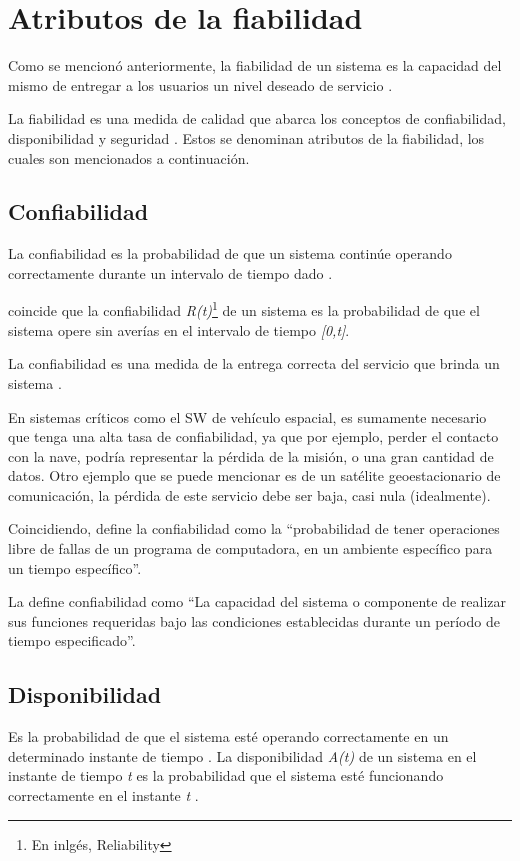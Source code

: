 \section{Atributos de la fiabilidad}\label{sec:atributos_de_la_fiabilidad}
Como se mencionó anteriormente, la fiabilidad de un sistema es la capacidad del mismo de entregar a los usuarios un nivel
deseado de servicio \citep{FTDesign}.

La fiabilidad es una medida de calidad  que abarca los conceptos de confiabilidad, disponibilidad y seguridad \citep{SoftwareFaultToleranceATutorial}. Estos se denominan atributos de la fiabilidad, los cuales son mencionados a continuación.

\subsection{Confiabilidad}\label{subsec:confiabilidad}
La confiabilidad es la probabilidad de que un sistema continúe operando correctamente durante un
intervalo de tiempo dado \citep{SoftwareFaultToleranceATutorial}.

\cite{FTDesign} coincide que la confiabilidad \textit{R(t)}\footnote{En inlgés, Reliability} de un
sistema es la probabilidad de que el sistema opere sin averías en el intervalo de tiempo
\textit{[0,t]}.

La confiabilidad es una medida de la entrega correcta del servicio que brinda un sistema
\citep{FTDesign}.

En sistemas críticos como el \ac{SW} de vehículo espacial, es sumamente necesario que tenga una
alta tasa de confiabilidad, ya que por ejemplo, perder el contacto con la nave, podría representar
la pérdida de la misión, o una gran cantidad de datos. Otro ejemplo que se puede mencionar es de un
satélite geoestacionario de comunicación, la pérdida de este servicio debe ser baja, casi nula
(idealmente).

Coincidiendo, \cite{pressman01} define la confiabilidad como la ``probabilidad de tener operaciones
libre de fallas de un programa de computadora, en un ambiente específico para un tiempo específico''. 

La \cite{IEEE610.12} define confiabilidad como ``La capacidad del sistema o componente de realizar
sus funciones requeridas bajo las condiciones establecidas durante un período de tiempo
especificado''.

\subsection{Disponibilidad}\label{subsec:disponibilidad}
Es la probabilidad de que el sistema esté operando correctamente en un determinado instante de
tiempo \citep{SoftwareFaultToleranceATutorial}. La disponibilidad \textit{A(t)} de un sistema en el
instante de tiempo \textit{t} es la probabilidad que el sistema esté funcionando correctamente en
el instante \textit{t} \citep{FTDesign}.

